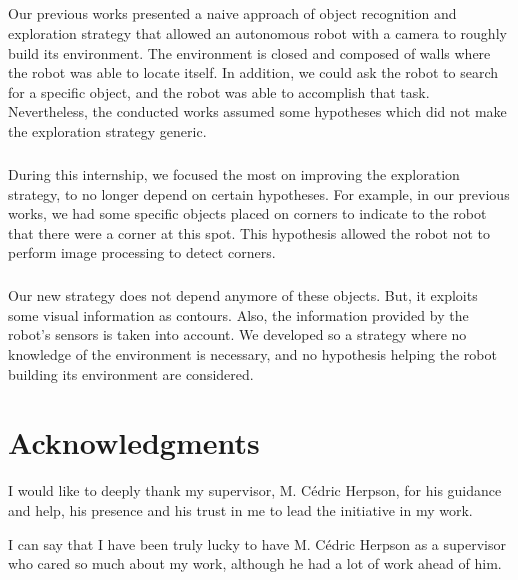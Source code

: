\documentclass[12pt]{report}
\begin{document}
	\paragraph{}
	Our previous works presented a naive approach of object recognition and exploration strategy that allowed an autonomous robot with a camera to roughly build its environment. The environment is closed and composed of walls where the robot was able to locate itself. In addition, we could ask the robot to search for a specific object, and the robot was able to accomplish that task. Nevertheless, the conducted works assumed some hypotheses which did not make the exploration strategy generic.
		
	\paragraph{}
	During this internship, we focused the most on improving the exploration strategy, to no longer depend on certain hypotheses. For example, in our previous works, we had some specific objects placed on corners to indicate to the robot that there were a corner at this spot. This hypothesis allowed the robot not to perform image processing to detect corners. 
	
	\paragraph{}
	Our new strategy does not depend anymore of these objects. But, it exploits some visual information as contours. Also, the information provided by the robot's sensors is taken into account. We developed so a strategy where no knowledge of the environment is necessary, and no hypothesis helping the robot building its environment are considered.
	
	\chapter{Acknowledgments}

	\begin{center}
		
	
	I would like to deeply thank my supervisor, M. Cédric Herpson, for his guidance and help, his presence and his trust in me to lead the initiative in my work. 
	
	I can say that I have been truly lucky to have M. Cédric Herpson as a supervisor who cared so much about my work, although he had a lot of work ahead of him. 
	\end{center}
	
\end{document}
